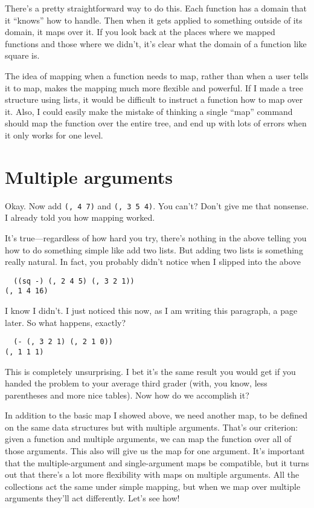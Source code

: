 \documentclass{article}
\newcommand{\code}[1]{\lstinline`#1`}
\begin{document}
There's a pretty straightforward way to do this. Each function has a domain that it ``knows'' how to handle. Then when it gets applied to something outside of its domain, it maps over it. If you look back at the places where we mapped functions and those where we didn't, it's clear what the domain of a function like square is.

The idea of mapping when a function needs to map, rather than when a user tells it to map, makes the mapping much more flexible and powerful. If I made a tree structure using lists, it would be difficult to instruct a function how to map over it. Also, I could easily make the mistake of thinking a single ``map'' command should map the function over the entire tree, and end up with lots of errors when it only works for one level.

\section{Multiple arguments}
Okay. Now add \code{(, 4 7)} and \code{(, 3 5 4)}. You can't? Don't give me that nonsense. I already told you how mapping worked.

It's true---regardless of how hard you try, there's nothing in the above telling you how to do something simple like add two lists. But adding two lists is something really natural. In fact, you probably didn't notice when I slipped into the above
\begin{lstlisting}
  ((sq -) (, 2 4 5) (, 3 2 1))
(, 1 4 16)
\end{lstlisting}
I know I didn't. I just noticed this now, as I am writing this paragraph, a page later. So what happens, exactly?
\begin{lstlisting}
  (- (, 3 2 1) (, 2 1 0))
(, 1 1 1)
\end{lstlisting}
This is completely unsurprising. I bet it's the same result you would get if you handed the problem to your average third grader (with, you know, less parentheses and more nice tables). Now how do we accomplish it?

In addition to the basic map I showed above, we need another map, to be defined on the same data structures but with multiple arguments. That's our criterion: given a function and multiple arguments, we can map the function over all of those arguments. This also will give us the map for one argument. It's important that the multiple-argument and single-argument maps be compatible, but it turns out that there's a lot more flexibility with maps on multiple arguments. All the collections act the same under simple mapping, but when we map over multiple arguments they'll act differently. Let's see how!
\end{document}
